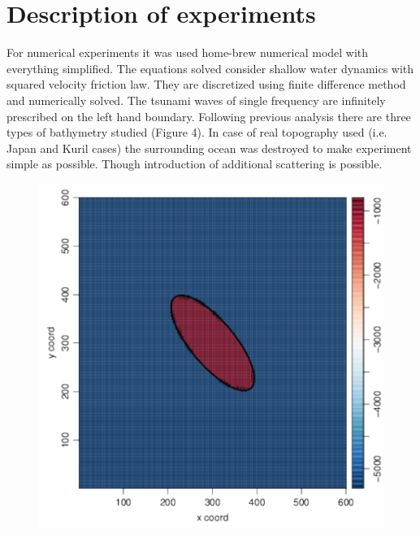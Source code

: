 \section{Description of experiments}
For numerical experiments it was used home-brew numerical model with everything simplified. The equations solved consider shallow water dynamics with squared velocity friction law. They are discretized using finite difference method and numerically solved. The tsunami waves of single frequency are infinitely prescribed on the left hand boundary. Following previous analysis there are three types of bathymetry studied (Figure 4). In case of real topography used (i.e. Japan and Kuril cases) the surrounding ocean was destroyed to make experiment simple as possible. Though introduction of additional scattering is possible.\\
\begin{figure}[h]
\includegraphics[scale=0.35]{../figures/ell_bathy.pdf}

\end{figure}

